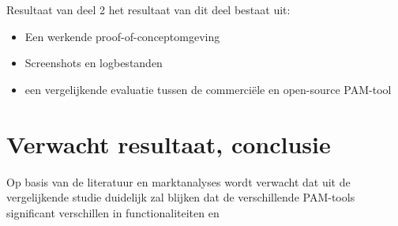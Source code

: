 Resultaat van deel 2
het resultaat van dit deel bestaat uit:
\begin{itemize}
\item Een werkende proof-of-conceptomgeving
\item Screenshots en logbestanden
\item een vergelijkende evaluatie tussen de commerciële en open-source PAM-tool
\end{itemize}
\section{Verwacht resultaat, conclusie}%
\label{sec:verwachte_resultaten}

Op basis van de literatuur en marktanalyses wordt verwacht dat uit de vergelijkende studie duidelijk zal blijken dat de verschillende PAM-tools significant verschillen in functionaliteiten en 
